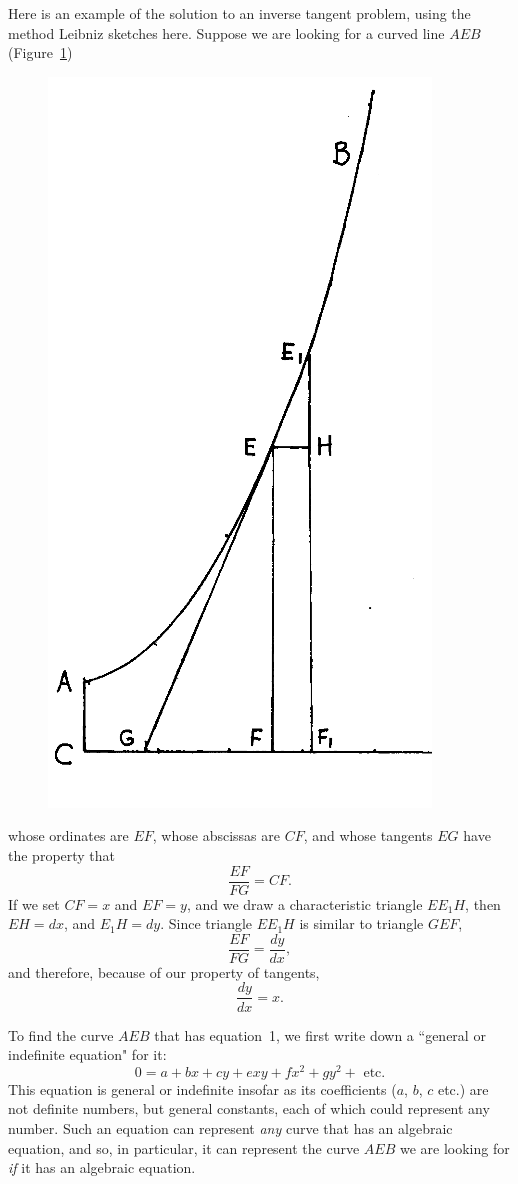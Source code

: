 \documentclass[polutonikogreek,english,twoside,openright]{article}
\begin{document}
Here is an example of the solution to an inverse tangent problem,
using the method Leibniz sketches here.  Suppose we are looking for a
curved line $AEB$ (Figure~\ref{invtan})
\begin{figure}[htp]
\begin{center}
\includegraphics[width=.5\textwidth]{fig/Figure33}
\caption{}
\label{invtan}
\vspace{-10pt}
\end{center}
\end{figure} whose ordinates are $EF$, whose abscissas are $CF$, and
whose tangents $EG$ have the property that
$$\frac{EF}{FG} = CF.$$
If we set $CF=x$ and $EF =y$, and we draw a characteristic triangle
$EE_1H$, then $EH =dx$, and $E_1H=dy$.  Since triangle $EE_1H$ is
similar to triangle $GEF$,
$$\frac{EF}{FG} = \frac{dy}{dx},$$
and therefore, because of our property of tangents,
\begin{equation}
\frac{dy}{dx} = x.
\end{equation}


To find the curve $AEB$ that has equation~1, we first write down a ``general or indefinite equation" for it:
\begin{equation}
\label{geneq}
 0 = a + bx + cy + exy + fx^2 + gy^2 + \mbox{ etc.}
 \end{equation}
 This equation is general or indefinite insofar as its coefficients
 ($a$, $b$, $c$ etc.) are not definite numbers, but general constants,
 each of which could represent any number.  Such an equation can
 represent {\em any} curve that has an algebraic equation, and so, in
 particular, it can represent the curve $AEB$ we are looking for {\em
   if} it has an algebraic equation.
\end{document}
